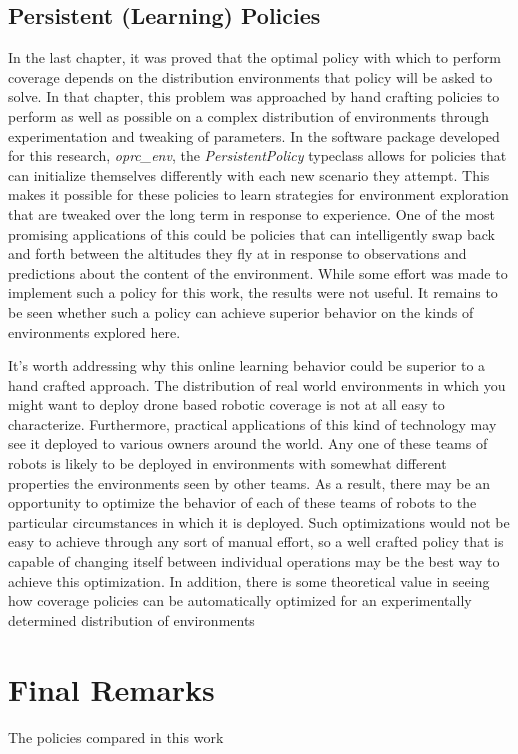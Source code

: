 \subsection{Persistent (Learning) Policies}

In the last chapter, it was proved that the optimal policy with which to perform coverage depends on the distribution environments that policy will be asked to solve. In that chapter, this problem was approached by hand crafting policies to perform as well as possible on a complex distribution of environments through experimentation and tweaking of parameters. In the software package developed for this research, \textit{oprc\_env}, the \textit{PersistentPolicy} typeclass allows for policies that can initialize themselves differently with each new scenario they attempt. This makes it possible for these policies to learn strategies for environment exploration that are tweaked over the long term in response to experience. One of the most promising applications of this could be policies that can intelligently swap back and forth between the altitudes they fly at in response to observations and predictions about the content of the environment. While some effort was made to implement such a policy for this work, the results were not useful. It remains to be seen whether such a policy can achieve superior behavior on the kinds of environments explored here.


It's worth addressing why this online learning behavior could be superior to a hand crafted approach. The distribution of real world environments in which you might want to deploy drone based robotic coverage is not at all easy to characterize. Furthermore, practical applications of this kind of  technology may see it deployed to various owners around the world. Any one of these teams of robots is likely to be deployed in environments with somewhat different properties the environments seen by other teams. As a result, there may be an opportunity to optimize the behavior of each of these teams of robots to the particular circumstances in which it is deployed. Such optimizations would not be easy to achieve through any sort of manual effort, so a well crafted policy that is capable of changing itself between individual operations may be the best way to achieve this optimization. In addition, there is some theoretical value in seeing how coverage policies can be automatically optimized for an experimentally determined distribution of environments

\section{Final Remarks}

The policies compared in this work